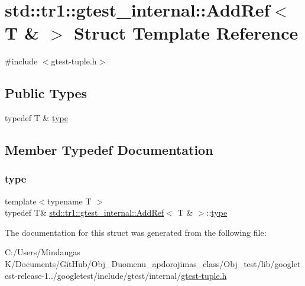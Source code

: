 \hypertarget{structstd_1_1tr1_1_1gtest__internal_1_1_add_ref_3_01_t_01_6_01_4}{}\section{std\+::tr1\+::gtest\+\_\+internal\+::Add\+Ref$<$ T \& $>$ Struct Template Reference}
\label{structstd_1_1tr1_1_1gtest__internal_1_1_add_ref_3_01_t_01_6_01_4}


{\ttfamily \#include $<$gtest-\/tuple.\+h$>$}

\subsection*{Public Types}
\begin{DoxyCompactItemize}
\item 
typedef T \& \mbox{\hyperlink{structstd_1_1tr1_1_1gtest__internal_1_1_add_ref_3_01_t_01_6_01_4_a9cb3b0992c2a9e7df42d01fb64c2dc88}{type}}
\end{DoxyCompactItemize}


\subsection{Member Typedef Documentation}
\mbox{\label{structstd_1_1tr1_1_1gtest__internal_1_1_add_ref_3_01_t_01_6_01_4_a9cb3b0992c2a9e7df42d01fb64c2dc88}} 
\subsubsection{\texorpdfstring{type}{type}}
{\footnotesize\ttfamily template$<$typename T $>$ \\
typedef T\& \mbox{\hyperlink{structstd_1_1tr1_1_1gtest__internal_1_1_add_ref}{std\+::tr1\+::gtest\+\_\+internal\+::\+Add\+Ref}}$<$ T \& $>$\+::\mbox{\hyperlink{structstd_1_1tr1_1_1gtest__internal_1_1_add_ref_3_01_t_01_6_01_4_a9cb3b0992c2a9e7df42d01fb64c2dc88}{type}}}



The documentation for this struct was generated from the following file\+:\begin{DoxyCompactItemize}
\item 
C\+:/\+Users/\+Mindaugas K/\+Documents/\+Git\+Hub/\+Obj\+\_\+\+Duomenu\+\_\+apdorojimas\+\_\+class/\+Obj\+\_\+test/lib/googletest-\/release-\/1../googletest/include/gtest/internal/\mbox{\hyperlink{gtest-tuple_8h}{gtest-\/tuple.\+h}}\end{DoxyCompactItemize}
